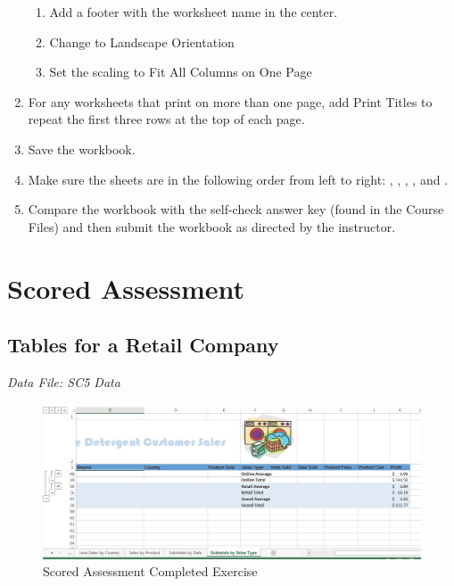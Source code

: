 \begin{enumerate}
	\begin{enumerate}
		\item Add a footer with the worksheet name in the center.
		\item Change to Landscape Orientation
		\item Set the scaling to Fit All Columns on One Page
	\end{enumerate}

	\item For any worksheets that print on more than one page, add Print Titles to repeat the first three rows at the top of each page.
	\item Save the  workbook.
	\item Make sure the sheets are in the following order from left to right: , , , , and .
	\item Compare the workbook with the self-check answer key (found in the Course Files) and then submit the  workbook as directed by the instructor.

\end{enumerate}

\section{Scored Assessment}

\subsection{Tables for a Retail Company}

\textit{Data File: SC5 Data}

\begin{figure}[H]
	\centering
	\includegraphics[width=\maxwidth{.95\linewidth}]{gfx/ch05_fig31}
	\caption{Scored Assessment Completed Exercise}
	\label{05:fig31}
\end{figure}

